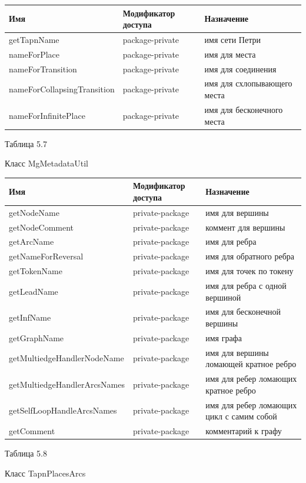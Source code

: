 \documentclass{../TechDoc}
\begin{document}
	\begin{tabular}{|p{5cm}|p{5cm}|p{5cm}|}
		\hline
		\textbf{Имя} & \textbf{Модификатор доступа} & \textbf{Назначение} \\
		\hline
		getTapnName& package-private & имя сети Петри \\
		\hline
		nameForPlace& package-private & имя для места\\
		\hline
		nameForTransition& package-private & имя для соединения\\
		\hline
		nameForCollapsingTransition& package-private & имя для схлопывающего места\\
		\hline
		nameForInfinitePlace& package-private & имя для бесконечного места\\
		
		\hline
	\end{tabular}
	\begin{flushright}
		Таблица 5.7
	\end{flushright}
	Класс MgMetadataUtil
	
	\begin{tabular}{|p{5cm}|p{5cm}|p{5cm}|}
		\hline
		\textbf{Имя} & \textbf{Модификатор доступа} & \textbf{Назначение} \\
		\hline
		getNodeName& private-package & имя для вершины\\
		\hline
		getNodeComment& private-package& коммент для вершины\\
		\hline
		getArcName&private-package & имя для ребра\\
		\hline
		getNameForReversal&private-package & имя для обратного ребра\\
		\hline
		getTokenName&private-package & имя для точек по токену\\
		\hline
		getLeadName&private-package & имя для ребра с одной вершиной\\
		\hline
		getInfName& private-package& имя для бесконечной вершины\\
		\hline
		getGraphName& private-package& имя графа\\
		\hline
		getMultiedgeHandlerNodeName& private-package& имя для вершины ломающей кратное ребро\\
		\hline
		getMultiedgeHandlerArcsNames&private-package & имя для ребер ломающих кратное ребро\\
		\hline
		getSelfLoopHandleArcsNames& private-package& имя для ребер ломающих цикл с самим собой\\
		\hline
		getComment&private-package & комментарий к графу \\
		
		\hline
	\end{tabular}
	\begin{flushright}
		Таблица 5.8
	\end{flushright}
	Класс TapnPlacesArcs
	
\end{document}
